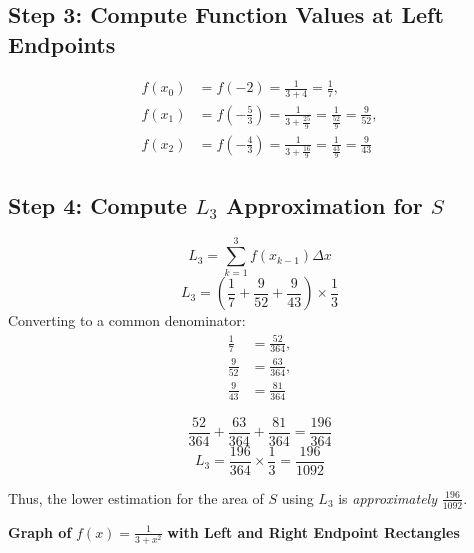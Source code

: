 \documentclass{article}
\begin{document}
\subsection*{Step 3: Compute Function Values at Left Endpoints}
\begin{align*}
f(x_0) &= f(-2) = \frac{1}{3 + 4} = \frac{1}{7}, \\
f(x_1) &= f\left(-\frac{5}{3} \right) = \frac{1}{3 + \frac{25}{9}} = \frac{1}{\frac{52}{9}} = \frac{9}{52}, \\
f(x_2) &= f\left(-\frac{4}{3} \right) = \frac{1}{3 + \frac{16}{9}} = \frac{1}{\frac{43}{9}} = \frac{9}{43}
\end{align*}

\subsection*{Step 4: Compute \( L_3 \) Approximation for $S$}
\[
L_3 = \sum_{k=1}^{3} f(x_{k-1}) \Delta x
\]
\[
L_3 = \left( \frac{1}{7} + \frac{9}{52} + \frac{9}{43} \right) \times \frac{1}{3}
\]
Converting to a common denominator:
\begin{align*}
\frac{1}{7} &= \frac{52}{364}, \\
\frac{9}{52} &= \frac{63}{364}, \\
\frac{9}{43} &= \frac{81}{364}
\end{align*}

\[
\frac{52}{364} + \frac{63}{364} + \frac{81}{364} = \frac{196}{364}
\]
\[
\boxed{L_3 = \frac{196}{364} \times \frac{1}{3} = \frac{196}{1092}}
\]

Thus, the lower estimation for the area of \( S \) using \( L_3 \) is \textit{approximately} $\frac{196}{1092}$.
\begin{center}
    \textbf{Graph of } \( f(x) = \frac{1}{3 + x^2} \) \textbf{ with Left and Right Endpoint Rectangles}
\end{center}
\end{document}
